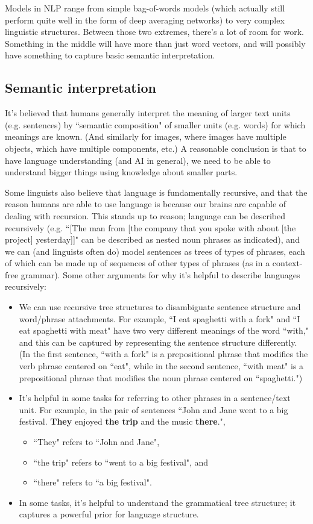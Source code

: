 Models in NLP range from simple bag-of-words models (which actually still perform quite well in the form of deep averaging networks) to very complex linguistic structures. Between those two extremes, there's a lot of room for work. Something in the middle will have more than just word vectors, and will possibly have something to capture basic semantic interpretation.

\subsection{Semantic interpretation}
It's believed that humans generally interpret the meaning of larger text units (e.g. sentences) by ``semantic composition" of smaller units (e.g. words) for which meanings are known. (And similarly for images, where images have multiple objects, which have multiple components, etc.) A reasonable conclusion is that to have language understanding (and AI in general), we need to be able to understand bigger things using knowledge about smaller parts.

Some linguists also believe that language is fundamentally recursive, and that the reason humans are able to use language is because our brains are capable of dealing with recursion. This stands up to reason; language can be described recursively (e.g. ``[The man from [the company that you spoke with about [the project] yesterday]]" can be described as nested noun phrases as indicated), and we can (and linguists often do) model sentences as trees of types of phrases, each of which can be made up of sequences of other types of phrases (as in a context-free grammar). Some other arguments for why it's helpful to describe languages recursively:
\begin{itemize}
\item We can use recursive tree structures to disambiguate sentence structure and word/phrase attachments. For example, ``I eat spaghetti with a fork" and ``I eat spaghetti with meat" have two very different meanings of the word ``with," and this can be captured by representing the sentence structure differently. (In the first sentence, ``with a fork" is a prepositional phrase that modifies the verb phrase centered on ``eat", while in the second sentence, ``with meat" is a prepositional phrase that modifies the noun phrase centered on ``spaghetti.")
\item It's helpful in some tasks for referring to other phrases in a sentence/text unit. For example, in the pair of sentences ``John and Jane went to a big festival. \textbf{They} enjoyed \textbf{the trip} and the music \textbf{there}.", 
\begin{itemize}
\item ``They" refers to ``John and Jane",
\item ``the trip" refers to ``went to a big festival", and
\item ``there" refers to ``a big festival".
\end{itemize}
\item In some tasks, it's helpful to understand the grammatical tree structure; it captures a powerful prior for language structure.
\end{itemize}

